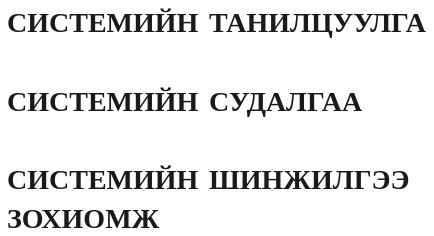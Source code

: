 \chapter{СИСТЕМИЙН ТАНИЛЦУУЛГА}


\chapter{СИСТЕМИЙН СУДАЛГАА}


\chapter{СИСТЕМИЙН ШИНЖИЛГЭЭ ЗОХИОМЖ}


% 

% 


